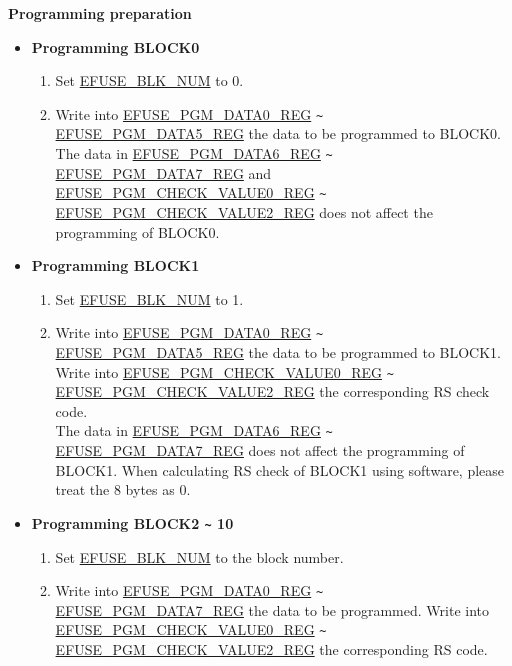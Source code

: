 \documentclass[main\_\_EN.tex]{subfiles}
\begin{document}
{\bfseries Programming preparation}

\begin{itemize}
    \item {\bfseries Programming BLOCK0}
    \begin{enumerate}
        \item Set \hyperref[fielddesc:EFUSEBLKNUM]{EFUSE\_BLK\_NUM} to 0.
        \item Write into \hyperref[regdesc:EFUSEPGMDATANREG]{EFUSE\_PGM\_DATA0\_REG} \verb+~+ \hyperref[regdesc:EFUSEPGMDATANREG]{EFUSE\_PGM\_DATA5\_REG} the data to be programmed to BLOCK0. \\
        The data in \hyperref[regdesc:EFUSEPGMDATANREG]{EFUSE\_PGM\_DATA6\_REG} \verb+~+ \hyperref[regdesc:EFUSEPGMDATANREG]{EFUSE\_PGM\_DATA7\_REG} and \hyperref[regdesc:EFUSEPGMCHECKVALUENREG]{EFUSE\_PGM\_CHECK\_VALUE0\_REG} \verb+~+ \hyperref[regdesc:EFUSEPGMCHECKVALUENREG]{EFUSE\_PGM\_CHECK\_VALUE2\_REG} does not affect the programming of BLOCK0.
    \end{enumerate}
    \item {\bfseries Programming BLOCK1}
    \begin{enumerate}
        \item Set \hyperref[fielddesc:EFUSEBLKNUM]{EFUSE\_BLK\_NUM} to 1.
        \item Write into \hyperref[regdesc:EFUSEPGMDATANREG]{EFUSE\_PGM\_DATA0\_REG} \verb+~+ \hyperref[regdesc:EFUSEPGMDATANREG]{EFUSE\_PGM\_DATA5\_REG} the data to be programmed to BLOCK1. Write into \hyperref[regdesc:EFUSEPGMCHECKVALUENREG]{EFUSE\_PGM\_CHECK\_VALUE0\_REG} \verb+~+ \hyperref[regdesc:EFUSEPGMCHECKVALUENREG]{EFUSE\_PGM\_CHECK\_VALUE2\_REG} the corresponding RS check code.\\
        The data in \hyperref[regdesc:EFUSEPGMDATANREG]{EFUSE\_PGM\_DATA6\_REG} \verb+~+ \hyperref[regdesc:EFUSEPGMDATANREG]{EFUSE\_PGM\_DATA7\_REG} does not affect the programming of BLOCK1. When calculating RS check of BLOCK1 using software, please treat the 8 bytes as 0.
    \end{enumerate}
    \item {\bfseries Programming BLOCK2 \verb+~+ 10}
    \begin{enumerate}
        \item Set \hyperref[fielddesc:EFUSEBLKNUM]{EFUSE\_BLK\_NUM} to the block number.
        \item Write into \hyperref[regdesc:EFUSEPGMDATANREG]{EFUSE\_PGM\_DATA0\_REG} \verb+~+ \hyperref[regdesc:EFUSEPGMDATANREG]{EFUSE\_PGM\_DATA7\_REG} the data to be programmed. Write into \hyperref[regdesc:EFUSEPGMCHECKVALUENREG]{EFUSE\_PGM\_CHECK\_VALUE0\_REG}  \verb+~+ \hyperref[regdesc:EFUSEPGMCHECKVALUENREG]{EFUSE\_PGM\_CHECK\_VALUE2\_REG} the corresponding RS code.
    \end{enumerate}
\end{itemize}
\end{document}
